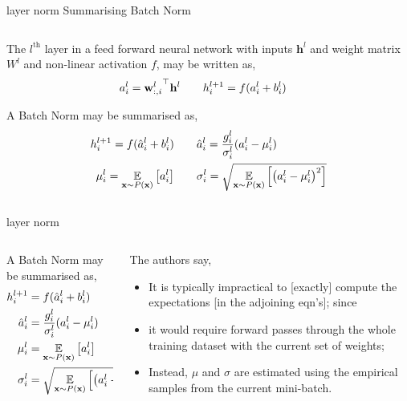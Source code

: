 \documentclass[aspectratio=169,xcolor={dvipsnames,svgnames}]{beamer}
\begin{document}
\begin{frame}[label={sec:layer-norm}]{layer norm}
Summarising Batch Norm
\begin{columns}
\begin{column}{0.7\columnwidth}
The \(l^{\text{th}}\) layer in a feed forward neural
network with inputs \(\mathbf{h}^l\) and weight matrix
\(W^{l}\) and non-linear activation \(f\), may be written
as,
\begin{align}
  \notag
  a_i^l &= {\mathbf{w}_{:,i}^l}^\top\mathbf{h}^l
          \qquad h_i^{l+1} = f(a_i^l+b_i^l) 
\end{align}

A Batch Norm may be summarised as,
\begin{align}
  \notag
  h_i^{l+1} = f(\hat{a}_i^l+b_i^l)
  &\qquad
    \hat{a}_i^l = \frac{g_i^l}{\sigma_i^l} (a_i^l -
    \mu_i^l) \\
  \notag
  \mu_i^l = \underset{\mathbf{x}\sim P(\mathbf{x})}
  {\mathbb{E}} \left[a_i^l\right]
  &\qquad
    \sigma_i^l = \sqrt{\underset{\mathbf{x}\sim
    P(\mathbf{x})} {\mathbb{E}} \left[\left(a_i^l -
    \mu_i^l\right)^2\right]}
\end{align}
\end{column}
\end{columns}
\end{frame}

\begin{frame}[label={sec:org981a3a3}]{layer norm}
\begin{columns}
\begin{column}{0.45\columnwidth}
A Batch Norm may be summarised as,
\begin{align}
  \notag
  h_i^{l+1} &= f(\hat{a}_i^l+b_i^l) \\
  \notag
  \hat{a}_i^l &= \frac{g_i^l}{\sigma_i^l} (a_i^l -
  \mu_i^l) \\
  \notag
  \mu_i^l &= \underset{\mathbf{x}\sim P(\mathbf{x})}
  {\mathbb{E}} \left[a_i^l\right] \\
  \notag
  \sigma_i^l &= \sqrt{\underset{\mathbf{x}\sim
  P(\mathbf{x})} {\mathbb{E}} \left[\left(a_i^l -
  \mu_i^l\right)^2\right]}
\end{align}
\end{column}


\begin{column}{0.55\columnwidth}
The authors say,
\begin{itemize}
\item It is typically impractical to [exactly] compute the
expectations [in the adjoining eqn's]; since
\item it would require forward passes through the whole
training dataset with the current set of weights;
\item Instead, \(\mu\) and \(\sigma\) are estimated using the
empirical samples from the current mini-batch.
\end{itemize}
\end{column}
\end{columns}
\end{frame}
\end{document}
